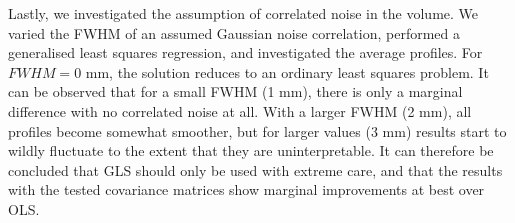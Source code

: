 Lastly, we investigated the assumption of correlated noise in the volume. We varied the FWHM of an assumed Gaussian noise correlation, performed a generalised least squares regression, and investigated the average profiles. For $FWHM= 0$ mm, the solution reduces to an ordinary least squares problem. It can be observed that for a small FWHM (1 mm), there is only a marginal difference with no correlated noise at all. With a larger FWHM (2 mm), all profiles become somewhat smoother, but for larger values (3 mm) results start to wildly fluctuate to the extent that they are uninterpretable. It can therefore be concluded that GLS should only be used with extreme care, and that the results with the tested covariance matrices show marginal improvements at best over OLS.

